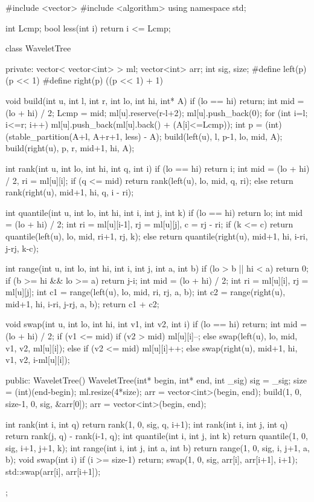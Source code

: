 \documentclass[11pt]{article}
\begin{document}
\begingroup\scriptsize
\begin{vncode}
#include <vector>
#include <algorithm>
using namespace std;

int Lcmp;
bool less(int i) { return i <= Lcmp; }

class WaveletTree {
private:
	vector< vector<int> > ml;
	vector<int> arr; 
	int sig, size;
#define left(p) (p << 1)
#define right(p) ((p << 1) + 1)
	
	void build(int u, int l, int r, int lo, int hi, int* A) {
		if (lo == hi) return;
		int mid = (lo + hi) / 2;
		Lcmp = mid;
		ml[u].reserve(r-l+2);
		ml[u].push_back(0);
		for (int i=l; i<=r; i++) {
			ml[u].push_back(ml[u].back() + (A[i]<=Lcmp));
		}
		int p = (int)(stable_partition(A+l, A+r+1, less) - A);
		build(left(u), l, p-1, lo, mid, A);
		build(right(u), p, r, mid+1, hi, A);
	}
	
	int rank(int u, int lo, int hi, int q, int i) {
		if (lo == hi) return i;
		int mid = (lo + hi) / 2, ri = ml[u][i];
		if (q <= mid) return rank(left(u), lo, mid, q, ri);
		else return rank(right(u), mid+1, hi, q, i - ri);
	}
	
	int quantile(int u, int lo, int hi, int i, int j, int k) {
		if (lo == hi) return lo;
		int mid = (lo + hi) / 2;
		int ri = ml[u][i-1], rj = ml[u][j], c = rj - ri;
		if (k <= c) return quantile(left(u), lo, mid, ri+1, rj, k);
		else return quantile(right(u), mid+1, hi, i-ri, j-rj, k-c);
	}
	
	int range(int u, int lo, int hi, int i, int j, int a, int b) {
		if (lo > b || hi < a) return 0;
		if (b >= hi && lo >= a) return j-i;
		int mid = (lo + hi) / 2;
		int ri = ml[u][i], rj = ml[u][j];
		int c1 = range(left(u), lo, mid, ri, rj, a, b);
		int c2 = range(right(u), mid+1, hi, i-ri, j-rj, a, b);
		return c1 + c2;
	}
	
	void swap(int u, int lo, int hi, int v1, int v2, int i) {
		if (lo == hi) return;
		int mid = (lo + hi) / 2;
		if (v1 <= mid) {
			if (v2 > mid) ml[u][i]--;
			else swap(left(u), lo, mid, v1, v2, ml[u][i]);
		}
		else {
			if (v2 <= mid) ml[u][i]++;
			else swap(right(u), mid+1, hi, v1, v2, i-ml[u][i]);			
		}
	}
	
public:
	WaveletTree() {}
	WaveletTree(int* begin, int* end, int _sig) {
		sig = _sig;
		size = (int)(end-begin);
		ml.resize(4*size);
		arr = vector<int>(begin, end);
		build(1, 0, size-1, 0, sig, &arr[0]);
		arr = vector<int>(begin, end);
	}
	
	int rank(int i, int q) { return rank(1, 0, sig, q, i+1); }
	int rank(int i, int j, int q) { return rank(j, q) - rank(i-1, q); }
	int quantile(int i, int j, int k) { return quantile(1, 0, sig, i+1, j+1, k); }
	int range(int i, int j, int a, int b) { return range(1, 0, sig, i, j+1, a, b); }
	void swap(int i) {
		if (i >= size-1) return;
		swap(1, 0, sig, arr[i], arr[i+1], i+1);
		std::swap(arr[i], arr[i+1]);
	}
};


\end{vncode}
\end{document}
